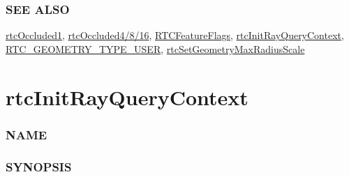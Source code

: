 \subsubsection{SEE ALSO}\label{see-also}

\hyperref[rtcoccluded1]{rtcOccluded1},
\hyperref[rtcoccluded4816]{rtcOccluded4/8/16},
\hyperref[rtcfeatureflags]{RTCFeatureFlags},
\hyperref[rtcinitrayquerycontext]{rtcInitRayQueryContext},
\hyperref[rtc_geometry_type_user]{RTC\_GEOMETRY\_TYPE\_USER},
\hyperref[rtcsetgeometrymaxradiusscale]{rtcSetGeometryMaxRadiusScale}

\pagebreak

\section{rtcInitRayQueryContext}\label{rtcinitrayquerycontext}

\subsubsection{NAME}\label{name}

\begin{Shaded}
\begin{Highlighting}[]
\OperatorTok{{-}}
\end{Highlighting}
\end{Shaded}

\subsubsection{SYNOPSIS}\label{synopsis}

\begin{Shaded}
\begin{Highlighting}[]

\OperatorTok{\{}
     \OperatorTok{;}
  
   \OperatorTok{[}\OperatorTok{];}
\OperatorTok{\};}

\OperatorTok{(}
  \OperatorTok{*}
\OperatorTok{);}
\end{Highlighting}
\end{Shaded}

